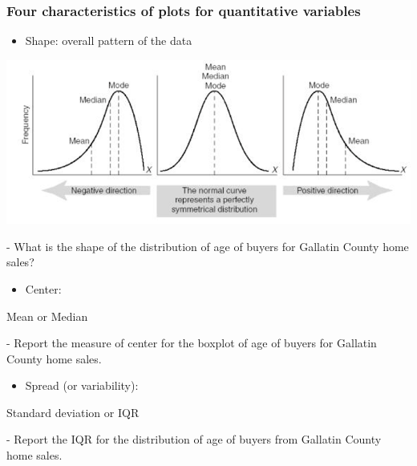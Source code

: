 \documentclass[
]{report}
\providecommand{\tightlist}{%
  \setlength{\itemsep}{0pt}\setlength{\parskip}{0pt}}
\newcommand{\rgi}{\hspace{24pt}}  %
\begin{document}
\newpage

\hypertarget{four-characteristics-of-plots-for-quantitative-variables}{%
\subsubsection*{Four characteristics of plots for quantitative variables}\label{four-characteristics-of-plots-for-quantitative-variables}}

\begin{itemize}
\tightlist
\item
  Shape: overall pattern of the data
\end{itemize}

\begin{center}\includegraphics[width=0.8\linewidth]{images/shape} \end{center}

\rgi \rgi - What is the shape of the distribution of age of buyers for Gallatin County home sales?

\vspace{0.3in}

\begin{itemize}
\tightlist
\item
  Center:
\end{itemize}

\rgi Mean or Median

\rgi \rgi - Report the measure of center for the boxplot of age of buyers for Gallatin County home sales.

\vspace{0.3in}

\begin{itemize}
\tightlist
\item
  Spread (or variability):
\end{itemize}

\rgi Standard deviation or IQR

\rgi \rgi - Report the IQR for the distribution of age of buyers from Gallatin County home sales.
\end{document}
